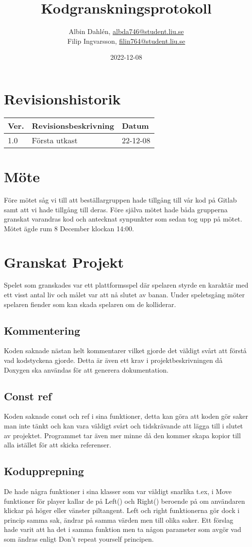 \documentclass{TDP005mall}
\author{Albin Dahlén, \url{albda746@student.liu.se}\\
  Filip Ingvarsson, \url{filin764@student.liu.se}}
\title{Kodgranskningsprotokoll}
\date{2022-12-08}
\begin{document}
\projectpage
\section{Revisionshistorik}
\begin{table}[!h]
\begin{tabularx}{\linewidth}{|l|X|l|}
\hline
Ver. & Revisionsbeskrivning & Datum \\\hline
1.0 & Första utkast & 22-12-08 \\\hline
\end{tabularx}
\end{table}

\section{Möte}
Före mötet såg vi till att beställargruppen hade tillgång till vår kod på Gitlab samt att vi hade tillgång till deras.
Före själva mötet hade båda grupperna granskat varandras kod och antecknat synpunkter som sedan tog upp på mötet.
Mötet ägde rum 8 December klockan 14:00.

\section{Granskat Projekt}
Spelet som granskades var ett plattformsspel där spelaren styrde en karaktär med ett visst antal liv och målet var att nå slutet av banan.
Under speletsgång möter spelaren fiender som kan skada spelaren om de kolliderar.

\subsection{Kommentering}
Koden saknade nästan helt kommentarer vilket gjorde det väldigt svårt att förstå vad kodstyckena gjorde.
Detta är även ett krav i projektbeskrivningen då Doxygen ska användas för att generera dokumentation.

\subsection{Const ref}
Koden saknade const och ref i sina funktioner, detta kan göra att koden gör saker man inte tänkt och kan vara väldigt svårt och tidskrävande att lägga till i slutet av projektet. 
Programmet tar även mer minne då den kommer skapa kopior till alla istället för att skicka referenser.

\subsection{Kodupprepning}
De hade några funktioner i sina klasser som var väldigt snarlika t.ex, i Move funktioner för player kallar de på Left() och Right() beroende på om användaren klickar på höger eller vänster piltangent. Left och right funktionerna gör dock i princip samma sak, ändrar på samma värden men till olika saker. Ett förslag hade varit att ha det i samma funktion men ta någon parameter som avgör vad som ändras enligt Don't repeat yourself principen.
\end{document}
